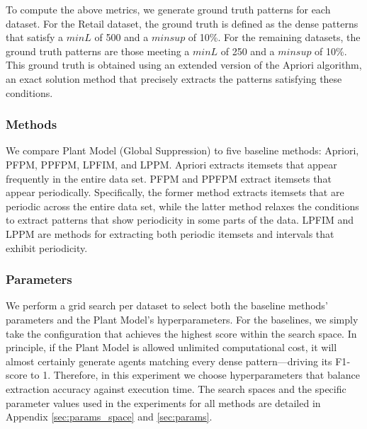 To compute the above metrics, we generate ground truth patterns for each dataset. For the Retail dataset, the ground truth is defined as the dense patterns that satisfy a $minL$ of 500 and a $minsup$ of 10\%. For the remaining datasets, the ground truth patterns are those meeting a $minL$ of 250 and a $minsup$ of 10\%. This ground truth is obtained using an extended version of the Apriori algorithm, an exact solution method that precisely extracts the patterns satisfying these conditions.

\subsubsection{Methods}
We compare Plant Model (Global Suppression) to five baseline methods: Apriori\cite{agrawal1994fast}, PFPM\cite{tanbeer2009discovering}, PPFPM\cite{kiran2017discovering}, LPFIM\cite{mahanta2005finding}, and LPPM\cite{fournier2021mining}.
Apriori extracts itemsets that appear frequently in the entire data set. PFPM and PPFPM extract itemsets that appear periodically. Specifically, the former method extracts itemsets that are periodic across the entire data set, while the latter method relaxes the conditions to extract patterns that show periodicity in some parts of the data.
LPFIM and LPPM are methods for extracting both periodic itemsets and intervals that exhibit periodicity.


\subsubsection{Parameters}
We perform a grid search per dataset to select both the baseline methods’ parameters and the Plant Model’s hyperparameters. For the baselines, we simply take the configuration that achieves the highest score within the search space. In principle, if the Plant Model is allowed unlimited computational cost, it will almost certainly generate agents matching every dense pattern—driving its F1‐score to 1. Therefore, in this experiment we choose hyperparameters that balance extraction accuracy against execution time. The search spaces and the specific parameter values used in the experiments for all methods are detailed in Appendix \ref{sec:params_space} and \ref{sec:params}.



